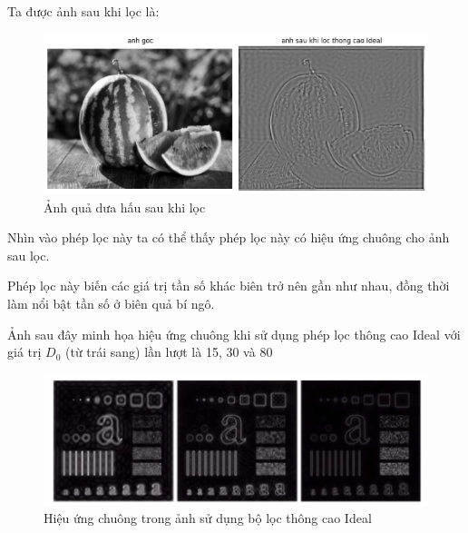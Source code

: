 \documentclass[12pt,a4paper]{report}
\numberwithin{equation}{section}
\theoremstyle{definition} %
\begin{document}
Ta được ảnh sau khi lọc là:
\begin{figure}[H]
\centering
\includegraphics[width=0.9\linewidth]{img/idealhighpass/IHPFanhgocvaAnhsauloc.png}
\caption{Ảnh quả dưa hấu sau khi lọc }
\end{figure}

Nhìn vào phép lọc này ta có thể thấy phép lọc này có hiệu ứng chuông cho ảnh sau lọc.

Phép lọc này biến các giá trị tần số khác biên trở nên gần như nhau, đồng thời làm nổi bật tần số ở biên quả bí ngô.

Ảnh sau đây minh họa hiệu ứng chuông khi sử dụng phép lọc thông cao Ideal với giá trị $D_0$ (từ trái sang) lần lượt là 15, 30 và 80

\begin{figure}[H]
\centering
\includegraphics[width=0.8\linewidth]{img/idealhighpass/IHPFvidu1.png}
\caption{Hiệu ứng chuông trong ảnh sử dụng bộ lọc thông cao Ideal}
\end{figure}
\end{document}
